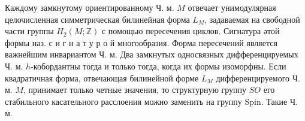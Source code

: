 \documentclass[10pt]{article}
\begin{document}
Каждому замкнутому ориентированному Ч. м. $M$ отвечает унимодулярная целочисленная симметрическая билинейная форма $L_{M}$, задаваемая на свободной части группы $H_{2}(M ; \mathbb{Z})$ с помощью пересечения циклов. Сигнатура әтой формы наз. с и г н а т у р о й многообразия. Форма пересечений является важнейшим инвариантом Ч. м. Два замкнутых односвязных дифференцируемых Ч. м. $h$-кобордантны тогда и только тогда, когда их формы изоморфны. Если квадратичная форма, отвечающая билинейной форме $L_{M}$ дифференцируемого Ч. м. $M$, принимает только четные значения, то структурную группу $S O$ его стабильного касательного расслоения можно заменить на группу Spin. Такие Ч. м.
\end{document}
